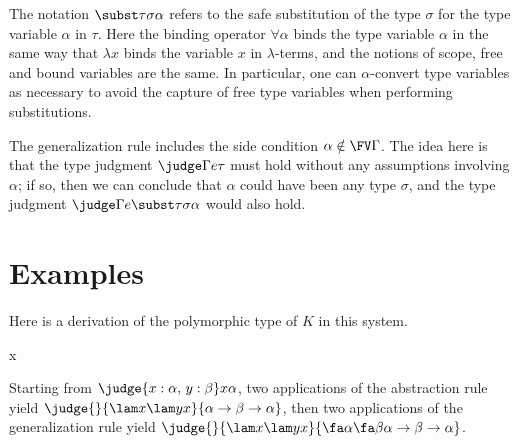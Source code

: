 The notation $\subst\tau\sigma\alpha$ refers to the safe substitution of the type $\sigma$ for the type variable $\alpha$ in $\tau$. Here the binding operator $\forall\alpha$ binds the type variable $\alpha$ in the same way that $\lambda x$ binds the variable $x$ in $\lambda$-terms, and the notions of scope, free and bound variables are the same. In particular, one can $\alpha$-convert type variables as necessary to avoid the capture of free type variables when performing substitutions.

The generalization rule includes the side condition $\alpha\notin\FV\Gamma$. The idea here is that the type judgment $\judge\Gamma e\tau$ must hold without any assumptions involving $\alpha$; if so, then we can conclude that $\alpha$ could have been any type $\sigma$, and the type judgment $\judge\Gamma e{\subst\tau\sigma\alpha}$ would also hold.

\section{Examples}

Here is a derivation of the polymorphic type of $K$ in this system.
\begin{center}
\mbox{}
   {
       {
          {
              {x\alpha}}}}
\end{center}
Starting from $\judge{x:\alpha,\,y:\beta}x\alpha$, two applications of the abstraction rule yield $\judge{}{\lam x{\lam yx}}{\alpha\to\beta\to\alpha}$, then two applications of the generalization rule yield $\judge{}{\lam x{\lam yx}}{\fa\alpha{\fa\beta{\alpha\to\beta\to\alpha}}}$.

